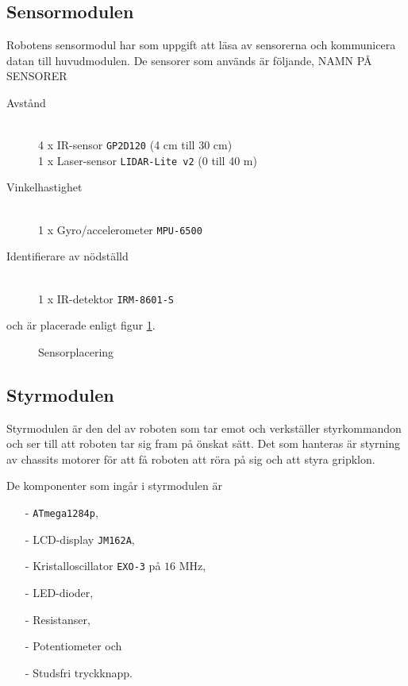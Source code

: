 \documentclass[11pt]{article}
\begin{document}
\begin{flushleft}
\subsection{Sensormodulen}
Robotens sensormodul har som uppgift att läsa av sensorerna och kommunicera datan till huvudmodulen. De sensorer som används är följande, NAMN PÅ SENSORER
\begin{description}
	\item[Avstånd] \hfill \\
	4 x IR-sensor \verb+GP2D120+ (4 cm till 30 cm) \\
	1 x Laser-sensor \verb+LIDAR-Lite v2+ (0 till 40 m) \\
	\item[Vinkelhastighet] \hfill \\
	1 x Gyro/accelerometer \verb+MPU-6500+ 
	\item[Identifierare av nödställd] \hfill \\
	1 x IR-detektor \verb+IRM-8601-S+
\end{description}
och är placerade enligt figur \ref{sensors}. 

\begin{figure}[htbp]
\centering
\noindent\resizebox{.8\textwidth}{!}{
		}
	\caption{Sensorplacering \label{sensors}}
\end{figure}

\subsection{Styrmodulen}

Styrmodulen är den del av roboten som tar emot och verkställer styrkommandon och ser till att roboten tar sig fram på önskat sätt. Det som hanteras är styrning av chassits motorer för att få roboten att röra på sig och att styra gripklon. 

De komponenter som ingår i styrmodulen är
\begin{itemize}
  \item[-] \verb+ATmega1284p+,
  \item[-] LCD-display \verb+JM162A+,
  \item[-] Kristalloscillator \verb+EXO-3+ på $16$ MHz,
  \item[-] LED-dioder, 
  \item[-] Resistanser,
  \item[-] Potentiometer och
  \item[-] Studsfri tryckknapp.
\end{itemize}


\end{flushleft}
\end{document}
